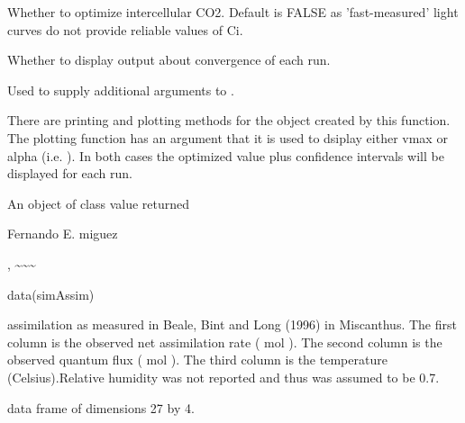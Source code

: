 \documentclass[letterpaper]{book}
\begin{document}
\begin{Arguments}
\begin{ldescription}
\item[\code{op.ci}] Whether to optimize intercellular CO2.
Default is FALSE as 'fast-measured' light curves do not
provide reliable values of Ci.

\item[\code{verbose}] Whether to display output about
convergence of each run.

\item[\code{...}] Used to supply additional arguments to
.
\end{ldescription}
\end{Arguments}
%
\begin{Details}\relax
There are printing and plotting methods for the object
created by this function. The plotting function has an
argument that it is used to dsiplay either vmax or alpha
(i.e. ). In both cases the
optimized value plus confidence intervals will be
displayed for each run.
\end{Details}
%
\begin{Value}
An object of class  
value returned 


\end{Value}
%
\begin{Author}\relax
Fernando E. miguez
\end{Author}
%
\begin{SeeAlso}\relax
{} 
, \textasciitilde{}\textasciitilde{}\textasciitilde{}
\end{SeeAlso}
%
\begin{Examples}
\begin{ExampleCode}
data(simAssim)
\end{ExampleCode}
\end{Examples}
%
\begin{Description}\relax
assimilation as measured in Beale, Bint and Long (1996)
in Miscanthus.  The first column is the observed net
assimilation rate (\eqn{\mu}{} mol 
).  The second column is the observed quantum
flux (\eqn{\mu}{} mol  ). The third
column is the temperature (Celsius).Relative humidity was
not reported and thus was assumed to be 0.7.
\end{Description}
%
\begin{Format}
data frame of dimensions 27 by 4.
\end{Format}
\end{document}
